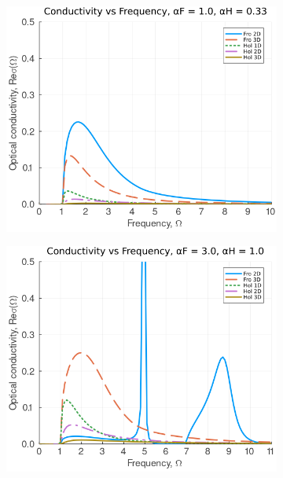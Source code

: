 \begin{figure}[!tbp]
    \centering
  \begin{subfigure}[b]{0.49\textwidth}
    \centering
    \includegraphics[width=\textwidth]{figures/re_con_freq_1_033.png}
  \end{subfigure}
  \hfill
  \begin{subfigure}[b]{0.49\textwidth}
    \centering
    \includegraphics[width=\textwidth]{figures/re_con_freq_3_1.png}
  \end{subfigure}
  \begin{subfigure}[b]{0.49\textwidth}

\end{subfigure}
\end{figure}
